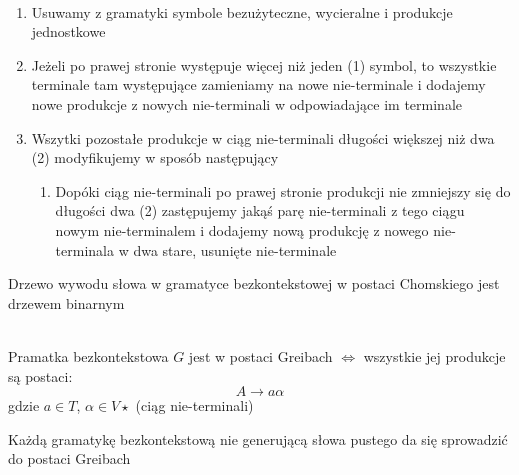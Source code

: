 	\begin{alg}~\\
		\begin{enumerate}
			\item Usuwamy z gramatyki symbole bezużyteczne, wycieralne i produkcje jednostkowe
			\item Jeżeli po prawej stronie występuje więcej niż jeden (1) symbol, to wszystkie
			terminale tam występujące zamieniamy na nowe nie-terminale i dodajemy
			nowe produkcje z nowych nie-terminali w odpowiadające im terminale
			\item Wszytki pozostałe produkcje w ciąg nie-terminali długości większej niż dwa (2)
			modyfikujemy w sposób następujący
				\begin{enumerate}
					\item Dopóki ciąg nie-terminali po prawej stronie produkcji nie zmniejszy się do długości dwa (2)
					zastępujemy jakąś parę nie-terminali z tego ciągu nowym nie-terminalem i dodajemy nową produkcję
					z nowego nie-terminala w dwa stare, usunięte nie-terminale
				\end{enumerate}
		\end{enumerate}
	\end{alg}
	
	\begin{uwaga}
		Drzewo wywodu słowa w gramatyce bezkontekstowej w postaci Chomskiego jest drzewem binarnym
	\end{uwaga}
	
	\begin{df}~\\
		Pramatka bezkontekstowa $G$ jest w postaci Greibach $\Leftrightarrow$ wszystkie jej produkcje są postaci:
		\begin{equation}
			A \rightarrow a\alpha
		\end{equation}
		gdzie $a\in T$, $\alpha \in V\star$ (ciąg nie-terminali)
	\end{df}
	
	\begin{lemat}
		Każdą gramatykę bezkontekstową nie generującą słowa pustego da się sprowadzić do postaci Greibach
	\end{lemat}
	
